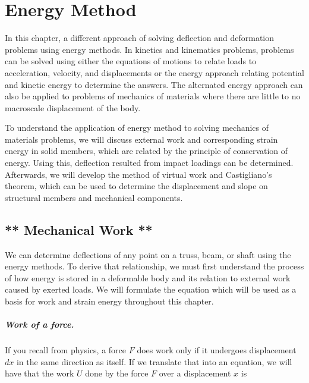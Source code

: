\documentclass[
fontsize=10pt,
a4paper,
twosides=false,
open=any,
svgnames,
]{kaobook} %
\begin{document}

\chapter{Energy Method}

In this chapter, a different approach of solving deflection and deformation problems using energy methods. In kinetics and kinematics problems, problems can be solved using either the equations of motions to relate loads to acceleration, velocity, and displacements or the energy approach relating potential and kinetic energy to determine the answers. The alternated energy approach can also be applied to problems of mechanics of materials where there are little to no macroscale displacement of the body.

To understand the application of energy method to solving mechanics of materials problems, we will discuss external work and corresponding strain energy in solid members, which are related by the principle of conservation of energy. Using this, deflection resulted from impact loadings can be determined. Afterwards, we will develop the method of virtual work and Castigliano's theorem, which can be used to determine the displacement and slope on structural members and mechanical components.

\section{** Mechanical Work **}

We can determine deflections of any point on a truss, beam, or shaft using the energy methods. To derive that relationship, we must first understand the process of how energy is stored in a deformable body and its relation to external work caused by exerted loads. We will formulate the equation which will be used as a basis for work and strain energy throughout this chapter.

\paragraph{Work of a force.}

If you recall from physics, a force $F$ does work only if it undergoes displacement $dx$ in the same direction as itself. If we translate that into an equation, we will have that the work $U$ done by the force $F$ over a displacement $x$ is
\end{document}
